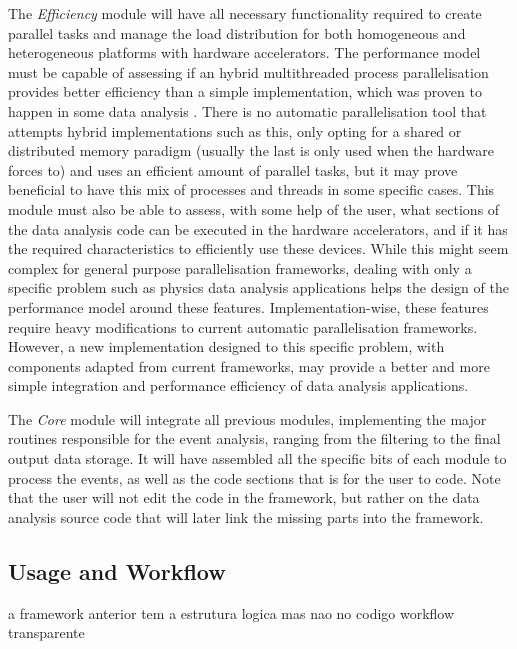 The \textit{Efficiency} module will have all necessary functionality required to create parallel tasks and manage the load distribution for both homogeneous and heterogeneous platforms with hardware accelerators. The performance model must be capable of assessing if an hybrid multithreaded process parallelisation provides better efficiency than a simple implementation, which was proven to happen in some data analysis \cite{paperAMP}. There is no automatic parallelisation tool that attempts hybrid implementations such as this, only opting for a shared or distributed memory paradigm (usually the last is only used when the hardware forces to) and uses an efficient amount of parallel tasks, but it may prove beneficial to have this mix of processes and threads in some specific cases. This module must also be able to assess, with some help of the user, what sections of the data analysis code can be executed in the hardware accelerators, and if it has the required characteristics to efficiently use these devices. While this might seem complex for general purpose parallelisation frameworks, dealing with only a specific problem such as physics data analysis applications helps the design of the performance model around these features. Implementation-wise, these features require heavy modifications to current automatic parallelisation frameworks. However, a new implementation designed to this specific problem, with components adapted from current frameworks, may provide a better and more simple integration and performance efficiency of data analysis applications.

The \textit{Core} module will integrate all previous modules, implementing the major routines responsible for the event analysis, ranging from the filtering to the final output data storage. It will have assembled all the specific bits of each module to process the events, as well as the code sections that is for the user to code. Note that the user will not edit the code in the framework, but rather on the data analysis source code that will later link the missing parts into the framework.

\subsection{Usage and Workflow}
\label{usage_workflow}

a framework anterior tem a estrutura logica mas nao no codigo
workflow transparente

